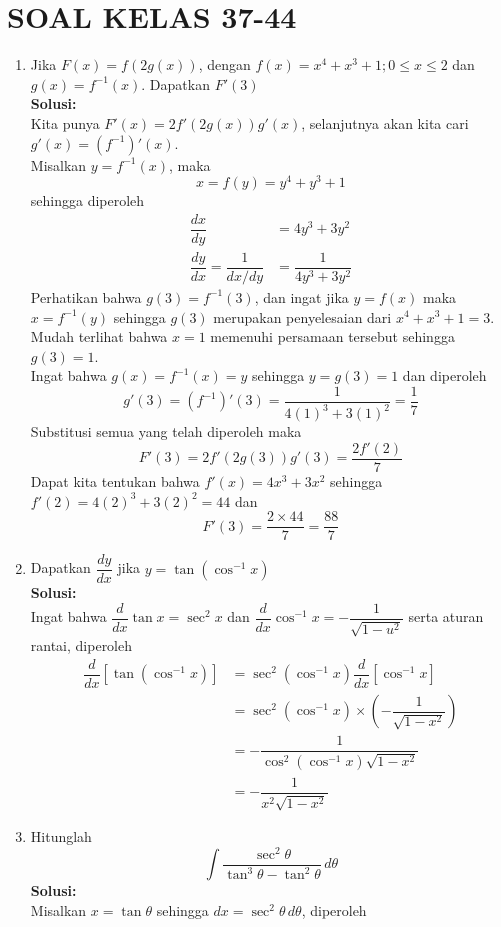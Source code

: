\documentclass{article}
\begin{document}
\section*{SOAL KELAS 37-44}
\begin{enumerate}
	\item Jika $F(x)=f(2g(x))$, dengan $f(x)=x^4+x^3+1;0\leq x\leq 2$ dan $g(x)=f^{-1}(x)$. Dapatkan $F'(3)$\\
	\textbf{Solusi:}\\
	Kita punya $F'(x)=2f'(2g(x))g'(x)$, selanjutnya akan kita cari $g'(x)=(f^{-1})'(x)$. \\Misalkan $y=f^{-1}(x)$, maka $$ x=f(y)=y^4+y^3+1 $$
sehingga diperoleh
\begin{align*}
\dfrac{dx}{dy} &= 4y^3+3y^2\\
\dfrac{dy}{dx} = \dfrac{1}{dx/dy} &= \dfrac{1}{4y^3+3y^2}
\end{align*}
Perhatikan bahwa $g(3)=f^{-1}(3)$, dan ingat jika $y=f(x)$ maka $x=f^{-1}(y)$ sehingga $g(3)$ merupakan penyelesaian dari $x^4+x^3+1=3$. \\
Mudah terlihat bahwa $x=1$ memenuhi persamaan tersebut sehingga $g(3)=1$. \\
Ingat bahwa $g(x)=f^{-1}(x)=y$ sehingga $y=g(3)=1$ dan diperoleh 
$$ g'(3)=(f^{-1})'(3)=\dfrac{1}{4(1)^3+3(1)^2} = \dfrac{1}{7}$$ 
Substitusi semua yang telah diperoleh maka $$F'(3)=2f'(2g(3))g'(3) = \dfrac{2f'(2)}{7} $$
Dapat kita tentukan bahwa $f'(x)=4x^3+3x^2$ sehingga $f'(2)=4(2)^3+3(2)^2=44$ dan 
$$ F'(3) = \dfrac{2\times 44}{7} = \dfrac{88}{7} $$
	\item Dapatkan $\dfrac{dy}{dx}$ jika $y=\tan(\cos^{-1}x)$
	\\ \textbf{Solusi:}\\
	Ingat bahwa $\dfrac{d}{dx}\tan x=\sec^2 x$ dan $\dfrac{d}{dx} \cos^{-1}x=-\dfrac{1}{\sqrt{1-u^2}}$ serta aturan rantai, diperoleh
	\begin{align*}
	\dfrac{d}{dx}[\tan(\cos^{-1}x)] &= \sec^2(\cos^{-1}x)\dfrac{d}{dx}[\cos^{-1}x]\\
	&= \sec^2(\cos^{-1}x)\times \left(-\dfrac{1}{\sqrt{1-x^2}}\right)\\
	&= -\dfrac{1}{\cos^2(\cos^{-1}x)\sqrt{1-x^2}}\\
	&= -\dfrac{1}{x^2\sqrt{1-x^2}}
	\end{align*}
	\newpage
	\item Hitunglah $$ \int \dfrac{\sec^2\theta}{\tan^3\theta-\tan^2\theta}\, d\theta$$
	\textbf{Solusi:}\\
	Misalkan $x=\tan \theta$ sehingga $dx = \sec^2\theta\, d\theta$, diperoleh

\end{enumerate}
\end{document}
